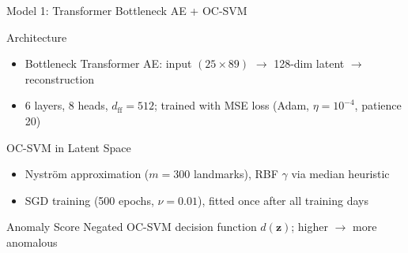 \documentclass{beamer}
\begin{document}
\begin{frame}{Model 1: Transformer Bottleneck AE + OC-SVM \cite{poutre_2024}}
    \begin{block}{Architecture}
        \begin{itemize}
            \item Bottleneck Transformer AE: input $(25 \times 89)$ $\to$ 128-dim latent $\to$ reconstruction
            \item 6 layers, 8 heads, $d_{\text{ff}}{=}512$; trained with MSE loss (Adam, $\eta{=}10^{-4}$, patience 20)
        \end{itemize}
    \end{block}
    \begin{block}{OC-SVM in Latent Space}
        \begin{itemize}
            \item Nystr{\"o}m approximation ($m{=}300$ landmarks), RBF $\gamma$ via median heuristic
            \item SGD training (500 epochs, $\nu{=}0.01$), fitted once after all training days
        \end{itemize}
    \end{block}
    \begin{block}{Anomaly Score}
        Negated OC-SVM decision function $d(\mathbf{z})$; higher $\to$ more anomalous
    \end{block}
\end{frame}
\end{document}
